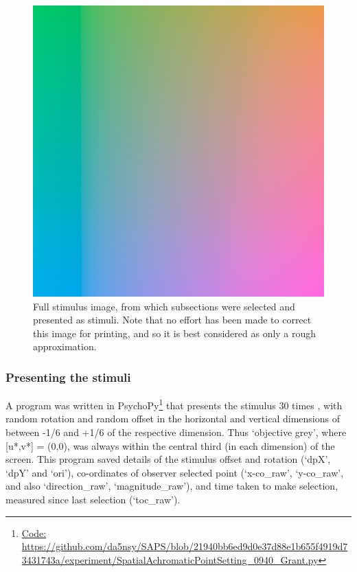 \begin{figure}[hbtp]
\includegraphics[max width=\textwidth]{figs/tablet/stimulus.png}
\caption{Full stimulus image, from which subsections were selected and presented as stimuli. Note that no effort has been made to correct this image for printing, and so it is best considered as only a rough approximation.}
\label{fig:Stimulus}
\end{figure}

\subsubsection{Presenting the stimuli} \label{sec:presenting_the_stimuli}
A program was written in PsychoPy\footnote{\url{Code:  https://github.com/da5nsy/SAPS/blob/21940bb6ed9d0e37d88e1b655f4919d73431743a/experiment/SpatialAchromaticPointSetting_0940_Grant.py}} that presents the stimulus 30 times %
, with random rotation and random offset in the horizontal and vertical dimensions of between -1/6 and +1/6 of the respective dimension. Thus `objective grey', where [u*,v*] = (0,0), was always within the central third (in each dimension) of the screen. This program saved details of the stimulus offset and rotation (`dpX', `dpY' and `ori'), co-ordinates of observer selected point (`x-co\_raw', `y-co\_raw', and also `direction\_raw', `magnitude\_raw'), and time taken to make selection, measured since last selection (`toc\_raw').

